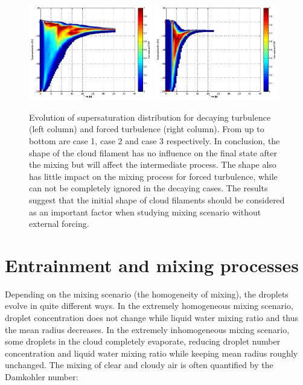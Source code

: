\documentclass[draft,jgrga]{AGUTeX}
\begin{document}
\begin{article}
\begin{figure}[H]
\includegraphics[width=0.48\textwidth]{Figures/pdf_supersat_d3}
\includegraphics[width=0.48\textwidth]{Figures/pdf_supersat_f3}
\caption{Evolution of supersaturation distribution for decaying turbulence (left column) and forced turbulence (right column). From up to bottom are case 1, case 2 and case 3 respectively. In conclusion, the shape of the cloud filament has no influence on the final state after the mixing but will affect the intermediate process. The shape also has little impact on the mixing process for forced turbulence, while can not be completely ignored in the decaying cases. The results suggest that the initial shape of cloud filaments should be considered as an important factor when studying mixing scenario without external forcing.}\label{fig:supersat_distri}
\end{figure}

\section{Entrainment and mixing processes}\label{mixing_processes}
Depending on the mixing scenario (the homogeneity of mixing), the
droplets evolve in quite different ways. In the extremely homogeneous mixing scenario, droplet concentration does not change while liquid water mixing ratio and thus the mean radius decreases. In the extremely inhomogeneous mixing scenario, some droplets in the cloud completely evaporate, reducing droplet number concentration and liquid water mixing ratio while keeping mean radius roughly unchanged. The mixing of clear and cloudy air is often quantified by the Damkohler number:


\end{article}
\end{document}
